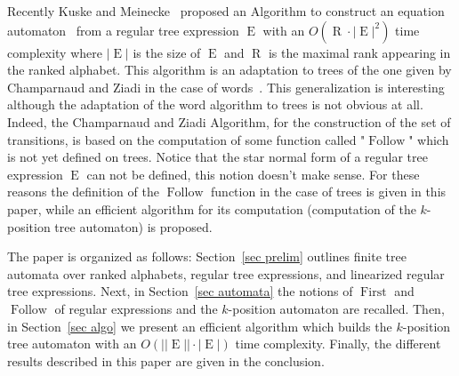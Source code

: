\documentclass{llncs}
\DeclareMathOperator{\First}{First}
\DeclareMathOperator{\Follow}{Follow}
\DeclareMathOperator{\E}{E}
\DeclareMathOperator{\ar}{R}
\begin{document}
Recently Kuske and Meinecke~\cite{automate2} proposed an Algorithm to construct an equation automaton~\cite{antimirov,ouardi} from a regular tree expression  $\E$  with an $O(\ar\cdot{|\E|}^2)$ time complexity where $|\E|$ is the size of $\E$ and $\ar$ is the maximal rank appearing in the ranked alphabet. 
This algorithm is an adaptation to trees of the one given by Champarnaud and Ziadi in the case of words~\cite{ZPC}. 
This generalization is interesting although the adaptation of the word algorithm to trees is not obvious at all.
Indeed, the Champarnaud and Ziadi Algorithm, for the construction of the set of transitions, is based 
on the computation of some function called "$\Follow$" which is not yet defined on trees.  
Notice that the star normal form of a regular tree expression $\E$ can not be defined, this notion doesn't make sense.  
For these reasons the definition of the $\Follow$ function in the case of trees is given in this paper, while an efficient algorithm for its computation (computation of the $k$-position tree automaton) is proposed. 

The paper is organized as follows: Section~\ref{sec prelim} outlines finite tree automata over ranked alphabets, regular tree expressions, and linearized regular tree expressions. Next, in Section~\ref{sec automata} the notions of $\First$ and $\Follow$ of regular expressions and the $k$-position automaton are recalled. Then, in Section~\ref{sec algo} we present an efficient algorithm which builds the $k$-position tree automaton with an $O(||\E||\cdot|\E|)$ time complexity. Finally, the different results described in this paper are given in the conclusion. 
\end{document}
